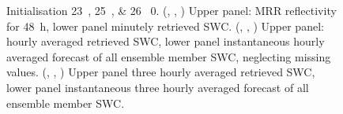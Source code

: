 \begin{figure}[t]
\begin{subfigure}[t]{\textwidth}
		\caption{}\label{fig:SWC3h:23}
	\end{subfigure}
	\caption{Initialisation \SIlist{23;25;26}{\dec} \SI{0}{\UTC}. 
		(\protect{}, \protect{}, \protect{}) Upper panel: MRR reflectivity for \SI{48}{\hour}, lower panel minutely retrieved SWC. 
		(\protect{}, \protect{}, \protect{}) Upper panel: hourly averaged retrieved SWC, lower panel instantaneous hourly averaged forecast of all ensemble member SWC, neglecting missing values. 
		(\protect{}, \protect{}, \protect{}) Upper panel three hourly averaged retrieved SWC, lower panel instantaneous three hourly averaged forecast of all ensemble member SWC.   }\label{fig:ret:SWC}
\end{figure}

